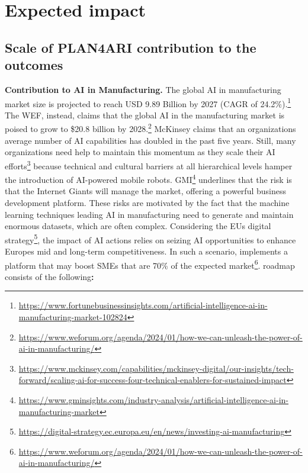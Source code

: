 

\section{\texorpdfstring{Expected impact
}{Expected impact }}\label{expected-impact}

\subsection{Scale of PLAN4ARI contribution to the
outcomes}\label{scale-of-plan4ari-contribution-to-the-outcomes}

\textbf{Contribution to AI in Manufacturing.} The global AI in
manufacturing market size is projected to reach USD 9.89 Billion by 2027
(CAGR of 24.2\%).\footnote{\url{https://www.fortunebusinessinsights.com/artificial-intelligence-ai-in-manufacturing-market-102824}}
The WEF, instead, claims that the global AI in the manufacturing market
is poised to grow to \$20.8 billion by 2028.\footnote{\url{https://www.weforum.org/agenda/2024/01/how-we-can-unleash-the-power-of-ai-in-manufacturing/}}
McKinsey claims that an organization\textquotesingle s average number of
AI capabilities has doubled in the past five years. Still, many
organizations need help to maintain this momentum as they scale their AI
efforts\footnote{\url{https://www.mckinsey.com/capabilities/mckinsey-digital/our-insights/tech-forward/scaling-ai-for-success-four-technical-enablers-for-sustained-impact}}
because technical and cultural barriers at all hierarchical levels
hamper the introduction of AI-powered mobile robots. GMI\footnote{\url{https://www.gminsights.com/industry-analysis/artificial-intelligence-ai-in-manufacturing-market}}
underlines that the risk is that the Internet Giants will manage the
market, offering a powerful business development platform. These risks
are motivated by the fact that the machine learning techniques leading
AI in manufacturing need to generate and maintain enormous datasets,
which are often complex. Considering the EU\textquotesingle s digital
strategy\footnote{\url{https://digital-strategy.ec.europa.eu/en/news/investing-ai-manufacturing}},
the impact of AI actions relies on seizing AI opportunities to enhance
Europe\textquotesingle s mid and long-term competitiveness. In such a
scenario,  implements a platform that may boost SMEs
that are 70\% of the expected market\footnote{\url{https://www.weforum.org/agenda/2024/01/how-we-can-unleash-the-power-of-ai-in-manufacturing/}}.
 roadmap consists of the following\textbf{:}

